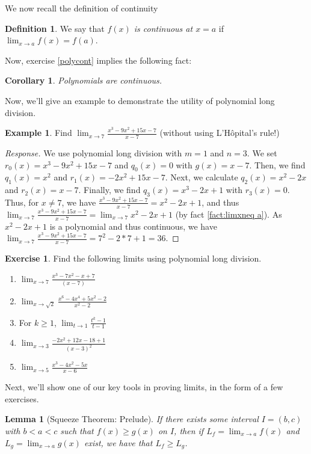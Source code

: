 \documentclass[english]{book}
\newtheorem{corollary}[theorem]{Corollary}
\newtheorem{lemma}[theorem]{Lemma}
\theoremstyle{remark}
\theoremstyle{definition}
\newtheorem{excs}{Exercise}[chapter]
\newtheorem{exle}[theorem]{Example}
\newtheorem{definition}[theorem]{Definition}
\newtheorem*{next week}{Next Week}
\newcommand{\dlim}{\displaystyle\lim}
\begin{document}
We now recall the definition of continuity
\begin{definition}
	We say that \emph{$f(x)$ is continuous at $x=a$} if $\dlim_{x\to a}f(x)=f(a)$.
\end{definition}
Now, exercise \ref{polycont} implies the following fact:
\begin{corollary}
	Polynomials are continuous.
\end{corollary}
Now, we'll give an example to demonstrate the utility of polynomial long division.
\begin{exle}\label{exle:pldlim}
	Find $\dlim_{x\to 7} \frac{x^3-9x^2+15x-7}{x-7}$ (without using L'H\^opital's rule!)
\end{exle}
\begin{proof}[Response]
We use polynomial long division with $m=1$ and $n=3$. We set $r_0(x)=x^3-9x^2+15x-7$ and $q_0(x)=0$ with $g(x)=x-7$. Then, we find $q_1(x)=x^2$ and $r_1(x)=-2x^2+15x-7$. Next, we calculate $q_2(x)=x^2-2x$ and $r_2(x)=x-7$. Finally, we find $q_3(x)=x^3-2x+1$ with $r_3(x)=0$. Thus, for $x\neq 7$, we have $\frac{x^3-9x^2+15x-7}{x-7}=x^2-2x+1$, and thus $\dlim_{x\to 7}\frac{x^3-9x^2+15x-7}{x-7}=\dlim_{x\to 7}x^2-2x+1$ (by fact \ref{fact:limxneq a}). As $x^2-2x+1$ is a polynomial and thus continuous, we have $\dlim_{x\to 7}\frac{x^3-9x^2+15x-7}{x-7}=7^2-2*7+1=36$.
\end{proof}
\begin{excs}
	Find the following limits using polynomial long division.\begin{enumerate}[label=\textit{(\alph*)}]
\item$\dlim_{x\to 7}\frac{x^3-7x^2-x+7}{(x-7)}$
\item$\dlim_{x\to \sqrt{2}}\frac{x^6-4x^4+5x^2-2}{x^2-2}$
\item For $k\geq 1$, $\dlim_{t\to 1}\frac{t^k-1}{t-1} $
\item $\dlim_{x\to 3}\frac{-2x^2+12x-18+1}{(x-3)^2}$
\item $\dlim_{x\to 5}\frac{x^3-4x^2-5x}{x-6}$
	\end{enumerate}
\end{excs}
Next, we'll show one of our key tools in proving limits, in the form of a few exercises.
\begin{lemma}[Squeeze Theorem: Prelude]\label{lem:presqz}
	If there exists some interval $I=(b,c)$ with $b<a<c$ such that $f(x)\geq g(x)$ on $I$, then if $L_f=\dlim_{x\to a}f(x)$ and $L_g=\dlim_{x\to a}g(x)$ exist, we have that $L_f\geq L_g$.
\end{lemma}
\end{document}
